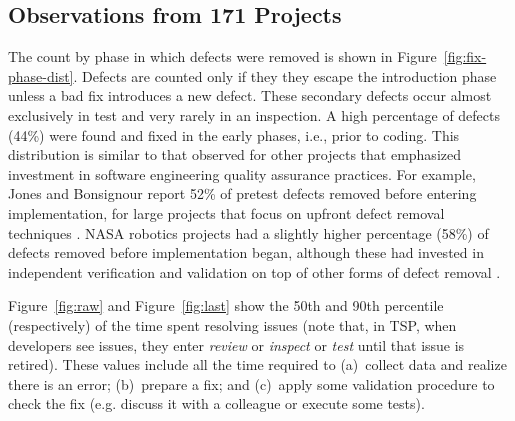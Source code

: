 \documentclass[smallcondensed]{svjour3}
\newcommand{\fig}[1]{Figure~\ref{fig:#1}}
\begin{document}
\subsection{Observations from 171 Projects}\label{sect:171projects}

The count by phase in which defects were removed is shown in Figure~\ref{fig:fix-phase-dist}. Defects are counted only if they they escape the introduction phase unless a bad fix introduces a new defect. These secondary defects occur almost exclusively in test and very rarely in an inspection. 
A high percentage of defects (44\%) were found and fixed in the early phases, i.e., prior to coding. This distribution is similar to that observed for other projects that emphasized investment in software engineering quality assurance practices. For example, Jones and Bonsignour report 52\% of pretest defects removed before entering implementation, for large projects that focus on upfront defect removal techniques \cite{jones12}. NASA robotics projects had a slightly higher percentage (58\%) of defects removed before implementation began, although these had invested in independent verification and validation on top of other forms of defect removal \cite{me08a}.  

\fig{raw} and \fig{last} show the  50th and 90th  percentile (respectively)
of the time spent resolving issues
(note that, in TSP, when developers see issues, they enter {\em review} or 
{\em inspect} or {\em test}
until that issue is retired).
These values include all the time required  to (a)~collect data and realize there is an error;
(b)~prepare a fix;  and (c)~apply some validation
procedure to check the fix (e.g. discuss it with a colleague or execute some tests).
\end{document}

